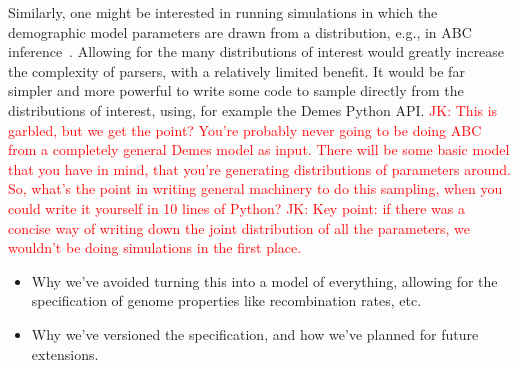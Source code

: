 \documentclass[11pt]{article}
\newcommand{\jkcomment}[1]{{\textcolor{red}{JK: #1}}}
\begin{document}
Similarly, one might be interested in running simulations in which
the demographic model parameters are drawn from a distribution, e.g.,
in ABC inference~\citep{beaumont2002approximate}. Allowing for
the many distributions of interest would greatly increase the complexity of
parsers, with a relatively limited benefit. It would be far simpler
and more powerful to write some code to sample directly from the
distributions of interest, using, for example the Demes Python
API.
\jkcomment{This is garbled, but we get the point? You're probably never
going to be doing ABC from a completely general Demes model as input.
There will be some basic model that you have in mind, that you're generating
distributions of parameters around. So, what's the point in writing
general machinery to do this sampling, when you could write it yourself in
10 lines of Python?}
\jkcomment{Key point: if there was a concise way of writing down the joint
distribution of all the parameters, we wouldn't be doing simulations in the
first place.}

\begin{itemize}
    \item Why we've avoided turning this into a model of everything, allowing
    for the specification of genome properties like recombination rates,
    etc.

    \item Why we've versioned the specification, and how we've planned
    for future extensions.

\end{itemize}
\end{document}
